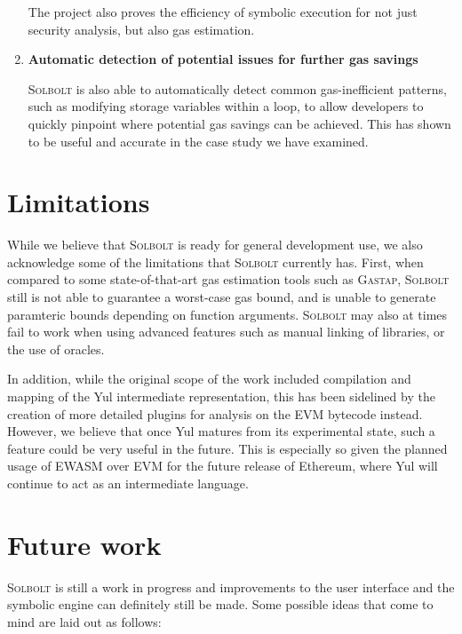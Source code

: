 \begin{enumerate}
    The project also proves the efficiency of symbolic execution for not just
    security analysis, but also gas estimation.

  \item \textbf{Automatic detection of potential issues for further gas savings}
  
    \textcolor{NavyBlue}{\textsc{Solbolt}} is also able to automatically detect common gas-inefficient patterns,
    such as modifying storage variables within a loop, to allow developers to 
    quickly pinpoint where potential gas savings can be achieved. This has shown
    to be useful and accurate in the case study we have examined.
    
\end{enumerate}

\section{Limitations}
While we believe that \textcolor{NavyBlue}{\textsc{Solbolt}} is ready for general development use, we also acknowledge some of
the limitations that \textcolor{NavyBlue}{\textsc{Solbolt}} currently has. First, when compared to some state-of-that-art
gas estimation tools such as \textsc{Gastap}, \textcolor{NavyBlue}{\textsc{Solbolt}} still is not able to guarantee a worst-case gas bound,
and is unable to generate paramteric bounds depending on function arguments. \textcolor{NavyBlue}{\textsc{Solbolt}} may also at times
fail to work when using advanced features such as manual linking of libraries, or the use of oracles.

In addition, while the original scope of the work included compilation and mapping of the
Yul intermediate representation, this has been sidelined by the creation of more detailed
plugins for analysis on the EVM bytecode instead. However, we believe that once Yul matures
from its experimental state, such a feature could be very useful in the future. This is especially so
given the planned usage of EWASM over EVM for the future release of Ethereum, where Yul will continue
to act as an intermediate language.

\section{Future work}
\textcolor{NavyBlue}{\textsc{Solbolt}} is still a work in progress and improvements to the user interface and the symbolic engine
can definitely still be made. Some possible ideas that come to mind are laid out as follows:

